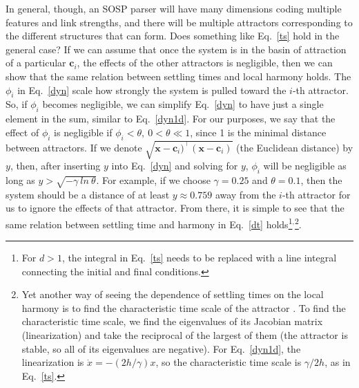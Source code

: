\documentclass[10pt,letterpaper]{article}
\begin{document}
In general, though, an SOSP parser will have many dimensions coding multiple features and link strengths, and there will be multiple attractors corresponding to the different structures that can form. Does something like Eq.~\ref{ts} hold in the general case? If we can assume that once the system is in the basin of attraction of a particular $\mathbf{c}_i$, the effects of the other attractors is negligible, then we can show that the same relation between settling times and local harmony holds. The $\phi_i$ in Eq.~\ref{dyn} scale how strongly the system is pulled toward the $i$-th attractor. So, if $\phi_i$ becomes negligible, we can simplify Eq.~\ref{dyn} to have just a single element in the sum, similar to Eq.~\ref{dyn1d}. For our purposes, we say that the effect of $\phi_i$ is negligible if $\phi_i < \theta,\ 0 < \theta \ll 1$, since 1 is the minimal distance between attractors. If we denote $\sqrt{\mathbf{x} - \mathbf{c}_i)^\intercal(\mathbf{x} - \mathbf{c}_i)}$ (the Euclidean distance) by $y$, then, after inserting $y$ into Eq.~\ref{dyn} and solving for $y$, $\phi_i$ will be negligible as long as $y > \sqrt{-\gamma~ln~\theta}$. For example, if we choose $\gamma = 0.25$ and $\theta = 0.1$, then the system should be a distance of at least $y \approx 0.759$ away from the $i$-th attractor for us to ignore the effects of that attractor. From there, it is simple to see that the same relation between settling time and harmony in Eq.~\ref{dt} holds\footnote{For $d > 1$, the integral in Eq.~\ref{ts} needs to be replaced with a line integral connecting the initial and final conditions.}$^,$\footnote{Yet another way of seeing the dependence of settling times on the local harmony is to find the characteristic time scale of the attractor \cite{strogatz1994nonlinear}. To find the characteristic time scale, we find the eigenvalues of its Jacobian matrix (linearization) and take the reciprocal of the largest of them (the attractor is stable, so all of its eigenvalues are negative). For Eq.~\ref{dyn1d}, the linearization is $\dot{x} = -(2h/\gamma)x$, so the characteristic time scale is $\gamma / 2h$, as in Eq.~\ref{ts}.}.
\end{document}
